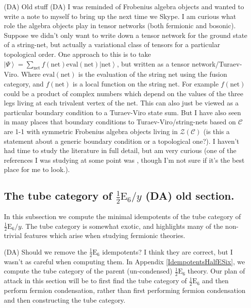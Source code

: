 \documentclass[12pt,a4paper]{article}
\newcommand{\mcz}{\mathcal{Z}}
\newcommand{\mcc}{\mathcal{C}}
\newcommand{\ket}[1]{\ensuremath{\left|#1\right\rangle}}
\newcommand{\dave}[1]{{\color{ao(english)}\footnotesize{(DA) #1}}}
\newcommand{\halfesix}{\frac{1}{2}\text{E}_6}
\begin{document}
\dave{Old stuff}
\dave{
I was reminded of Frobenius algebra objects and wanted to write a note to myself to bring up the next time we Skype.
I am curious what role the algebra objects play in tensor networks (both fermionic and bosonic).
Suppose we didn't only want to write down a tensor network for the ground state of a string-net, 
but actually a variational class of tensors for a particular topological order.
One approach to this is to take $\ket{\Psi} = \sum_{\text{net}} f(\text{net}) \text{eval}(\text{net}) \ket{\text{net}}$, but written as a tensor network/Turaev-Viro. 
Where $\text{eval}(\text{net})$ is the evaluation of the string net using the fusion category, 
and $f(\text{net})$ is a local function on the string net.
For example $f(\text{net})$ could be a product of complex numbers which depend on the values of the three legs living at each trivalent vertex of the net. 
This can also just be viewed as a particular boundary condition to a Turaev-Viro state sum.
But I have also seen in many places that boundary conditions to Turaev-Viro/string-nets 
based on $\mcc$ are 1-1 with symmetric Frobenius algebra objects living in $\mcz(\mcc)$ (is this a statement about a generic boundary condition or a topological one?).
I haven't had time to study the literature in full detail, but am very curious 
(one of the references I was studying at some point was \cite{Schauenburg2001}, 
though I'm not sure if it's the best place for me to look.).
}




\subsection{The tube category of $\halfesix / y$ \dave{old section.} }

In this subsection we compute the minimal idempotents of the tube category of $\halfesix / y$. 
The tube category is somewhat exotic, and highlights many of the non-trivial features which arise when studying fermionic theories. 

\dave{Should we remove the $\halfesix$ idempotents? 
I think they are correct, but I wasn't as careful when computing them.}
In Appendix \ref{IdempotentsHalfESix}, we compute the tube category of the parent (un-condensed) $\halfesix$ theory. 
Our plan of attack in this section will be to first find the tube category of $\halfesix$ and then perform 
fermion condensation, rather than first performing fermion condensation and then constructing the tube category. 
 
\end{document}
